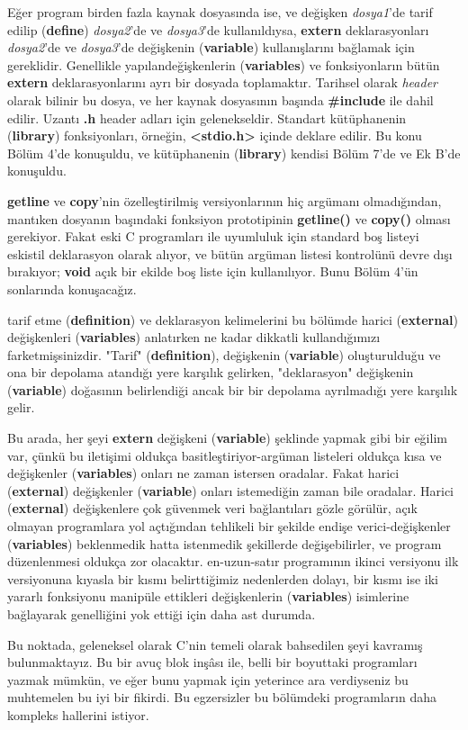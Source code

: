 \documentclass[a4paper,12pt,oneside]{book}
\begin{document}
\par Eğer program birden fazla kaynak dosyasında ise, ve değişken \textit{dosya1}'de tarif edilip (\textbf{define}) \textit{dosya2}'de ve \textit{dosya3}'de kullanıldıysa, \textbf{extern} deklarasyonları \textit{dosya2}'de ve \textit{dosya3}'de değişkenin (\textbf{variable}) kullanışlarını bağlamak için gereklidir. Genellikle yapılandeğişkenlerin (\textbf{variables}) ve fonksiyonların bütün \textbf{extern} deklarasyonlarını ayrı bir dosyada toplamaktır. Tarihsel olarak \textit{header} olarak bilinir bu dosya, ve her kaynak dosyasının başında \textbf{\#include} ile dahil edilir. Uzantı \textbf{.h} header adları için gelenekseldir. Standart kütüphanenin (\textbf{library}) fonksiyonları, örneğin, \textbf{<stdio.h>} içinde deklare edilir. Bu konu Bölüm 4'de konuşuldu, ve kütüphanenin (\textbf{library}) kendisi Bölüm 7'de ve Ek B'de konuşuldu.
\par \textbf{getline} ve \textbf{copy}'nin özelleştirilmiş versiyonlarının hiç argümanı olmadığından, mantıken dosyanın başındaki fonksiyon prototipinin \textbf{getline()} ve \textbf{copy()} olması gerekiyor. Fakat eski C programları ile uyumluluk için standard boş listeyi eskistil deklarasyon olarak alıyor, ve bütün argüman listesi kontrolünü devre dışı bırakıyor; \textbf{void} açık bir ekilde boş liste için kullanılıyor. Bunu Bölüm 4'ün sonlarında konuşacağız.
\par tarif etme (\textbf{definition}) ve deklarasyon kelimelerini bu bölümde harici (\textbf{external}) değişkenleri (\textbf{variables}) anlatırken ne kadar dikkatli kullandığımızı farketmişsinizdir. "Tarif" (\textbf{definition}), değişkenin (\textbf{variable}) oluşturulduğu ve ona bir depolama atandığı yere karşılık gelirken, "deklarasyon" değişkenin (\textbf{variable}) doğasının belirlendiği ancak bir bir depolama ayrılmadığı yere karşılık gelir.
\par Bu arada, her şeyi \textbf{extern} değişkeni (\textbf{variable}) şeklinde yapmak gibi bir eğilim var, çünkü bu iletişimi oldukça basitleştiriyor-argüman listeleri oldukça kısa ve değişkenler (\textbf{variables}) onları ne zaman istersen oradalar. Fakat harici (\textbf{external}) değişkenler (\textbf{variable}) onları istemediğin zaman bile oradalar. Harici (\textbf{external}) değişkenlere çok güvenmek veri bağlantıları gözle görülür, açık olmayan programlara yol açtığından tehlikeli bir şekilde endişe verici-değişkenler (\textbf{variables}) beklenmedik hatta istenmedik şekillerde değişebilirler, ve program düzenlenmesi oldukça zor olacaktır. en-uzun-satır programının ikinci versiyonu ilk versiyonuna kıyasla bir kısmı belirttiğimiz nedenlerden dolayı, bir kısmı ise iki yararlı fonksiyonu manipüle ettikleri değişkenlerin (\textbf{variables}) isimlerine bağlayarak genelliğini yok ettiği için daha ast durumda. \pagebreak
\newline
\par Bu noktada, geleneksel olarak C'nin temeli olarak bahsedilen şeyi kavramış bulunmaktayız. Bu bir avuç blok inşâsı ile, belli bir boyuttaki programları yazmak mümkün, ve eğer bunu yapmak için yeterince ara verdiyseniz bu muhtemelen bu iyi bir fikirdi. Bu egzersizler bu bölümdeki programların daha kompleks hallerini istiyor. \newline
\end{document}

